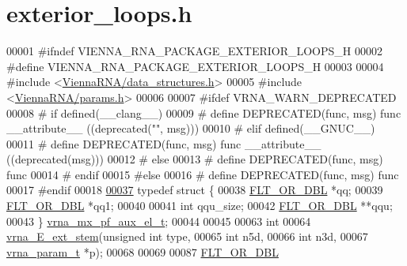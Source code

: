 \hypertarget{exterior__loops_8h_source}{}\section{exterior\+\_\+loops.\+h}
\label{exterior__loops_8h_source}

\begin{DoxyCode}
00001 \textcolor{preprocessor}{#ifndef VIENNA\_RNA\_PACKAGE\_EXTERIOR\_LOOPS\_H}
00002 \textcolor{preprocessor}{#define VIENNA\_RNA\_PACKAGE\_EXTERIOR\_LOOPS\_H}
00003 
00004 \textcolor{preprocessor}{#include <\hyperlink{data__structures_8h}{ViennaRNA/data\_structures.h}>}
00005 \textcolor{preprocessor}{#include <\hyperlink{params_8h}{ViennaRNA/params.h}>}
00006 
00007 \textcolor{preprocessor}{#ifdef VRNA\_WARN\_DEPRECATED}
00008 \textcolor{preprocessor}{# if defined(\_\_clang\_\_)}
00009 \textcolor{preprocessor}{#  define DEPRECATED(func, msg) func \_\_attribute\_\_ ((deprecated("", msg)))}
00010 \textcolor{preprocessor}{# elif defined(\_\_GNUC\_\_)}
00011 \textcolor{preprocessor}{#  define DEPRECATED(func, msg) func \_\_attribute\_\_ ((deprecated(msg)))}
00012 \textcolor{preprocessor}{# else}
00013 \textcolor{preprocessor}{#  define DEPRECATED(func, msg) func}
00014 \textcolor{preprocessor}{# endif}
00015 \textcolor{preprocessor}{#else}
00016 \textcolor{preprocessor}{# define DEPRECATED(func, msg) func}
00017 \textcolor{preprocessor}{#endif}
00018 
\hyperlink{group__loops}{00037} \textcolor{keyword}{typedef} \textcolor{keyword}{struct }\{
00038   \hyperlink{group__data__structures_ga31125aeace516926bf7f251f759b6126}{FLT\_OR\_DBL}  *qq;
00039   \hyperlink{group__data__structures_ga31125aeace516926bf7f251f759b6126}{FLT\_OR\_DBL}  *qq1;
00040 
00041   \textcolor{keywordtype}{int}         qqu\_size;
00042   \hyperlink{group__data__structures_ga31125aeace516926bf7f251f759b6126}{FLT\_OR\_DBL}  **qqu;
00043 \} \hyperlink{group__loops_structvrna__mx__pf__aux__el__t}{vrna\_mx\_pf\_aux\_el\_t};
00044 
00045 
00063 \textcolor{keywordtype}{int}
00064 \hyperlink{group__loops_gaa0c313c90da11aa741dcd62746d85337}{vrna\_E\_ext\_stem}(\textcolor{keywordtype}{unsigned} \textcolor{keywordtype}{int}  type,
00065                 \textcolor{keywordtype}{int}           n5d,
00066                 \textcolor{keywordtype}{int}           n3d,
00067                 \hyperlink{group__energy__parameters_structvrna__param__s}{vrna\_param\_t}  *p);
00068 
00069 
00087 \hyperlink{group__data__structures_ga31125aeace516926bf7f251f759b6126}{FLT\_OR\_DBL}

\end{DoxyCode}
